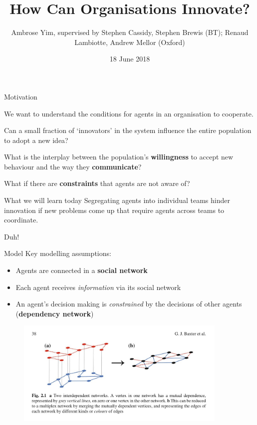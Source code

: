 \documentclass[10pt, xcolor=dvipsnames]{beamer}
\title{How Can Organisations Innovate?}
\date{18 June 2018}
\author{Ambrose Yim, supervised by Stephen Cassidy, Stephen Brewis (BT); Renaud Lambiotte, Andrew Mellor (Oxford)}
\institute{InFoMM CDT, Mathematical Institute, University of Oxford}
\begin{document}
\maketitle

\begin{frame}{Motivation}

We want to understand the conditions for agents in an organisation to cooperate.

\pause Can a small fraction of `innovators' in the system influence the entire population to adopt a new idea?

\pause What is the interplay between the population's \textbf{willingness} to accept new behaviour and the way they \textbf{communicate}?

\pause What if there are \textbf{constraints} that agents are not aware of?
\end{frame}

\begin{frame}{What we will learn today}
Segregating agents into individual teams hinder innovation if new problems come up that require agents across teams to coordinate.

\pause Duh!
\end{frame}

\begin{frame}{Model}
Key modelling assumptions:
\begin{itemize}
\pause \item Agents are connected in a \textbf{social network} \cite{wang_social_2018} \cite{granell_dynamical_2013}
\pause \item Each agent receives \emph{information} via its social network
\pause \item An agent's decision making is \emph{constrained} by the decisions of other agents (\textbf{dependency network})
\end{itemize}

\end{frame}

\begin{frame}

\begin{figure}[htb]
\includegraphics[width=0.9\textwidth]{figures/multiplex.jpeg}
\end{figure}
\end{frame}
\end{document}
